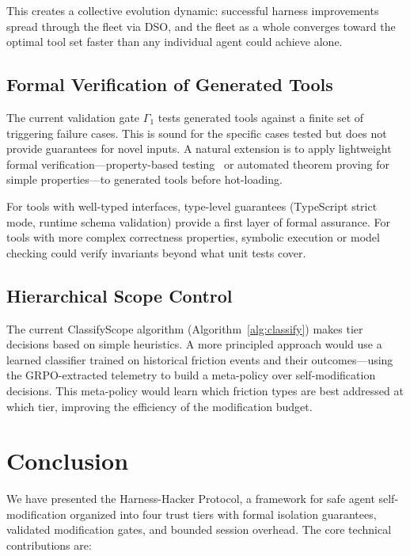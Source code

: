 \documentclass[11pt]{article}
\begin{document}
This creates a collective evolution dynamic: successful harness improvements
spread through the fleet via DSO, and the fleet as a whole converges toward
the optimal tool set faster than any individual agent could achieve alone.

\subsection{Formal Verification of Generated Tools}
\label{sec:verification}

The current validation gate $\Gamma_1$ tests generated tools against a finite
set of triggering failure cases. This is sound for the specific cases tested
but does not provide guarantees for novel inputs. A natural extension is to
apply lightweight formal verification---property-based testing~\cite{claessen2000quickcheck}
or automated theorem proving for simple properties---to generated tools before
hot-loading.

For tools with well-typed interfaces, type-level guarantees (TypeScript strict
mode, runtime schema validation) provide a first layer of formal assurance.
For tools with more complex correctness properties, symbolic execution or
model checking could verify invariants beyond what unit tests cover.

\subsection{Hierarchical Scope Control}
\label{sec:scope-control}

The current ClassifyScope algorithm (Algorithm~\ref{alg:classify}) makes
tier decisions based on simple heuristics. A more principled approach would
use a learned classifier trained on historical friction events and their
outcomes---using the GRPO-extracted telemetry to build a meta-policy over
self-modification decisions. This meta-policy would learn which friction types
are best addressed at which tier, improving the efficiency of the modification
budget.

\section{Conclusion}
\label{sec:conclusion}

We have presented the Harness-Hacker Protocol, a framework for safe agent
self-modification organized into four trust tiers with formal isolation
guarantees, validated modification gates, and bounded session overhead. The
core technical contributions are:
\end{document}
